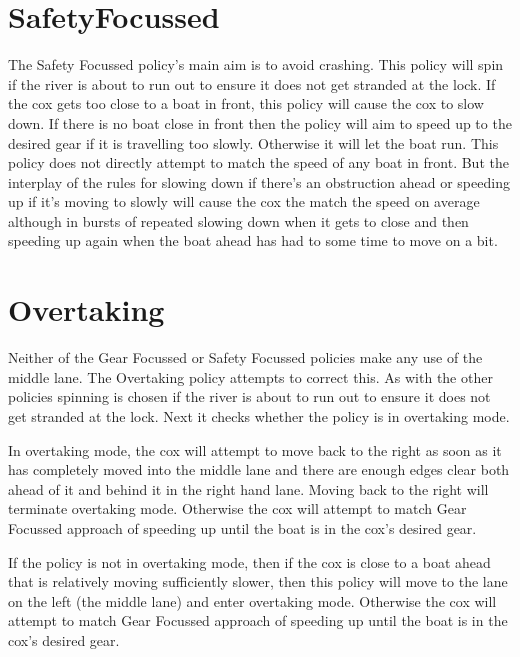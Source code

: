 \section{SafetyFocussed}

The Safety Focussed policy's main aim is to avoid crashing. This policy will spin if the river is about to run out to ensure it does not get stranded at the lock. If the cox gets too close to a boat in front, this policy will cause the cox to slow down. If there is no boat close in front then the policy will aim to speed up to the desired gear if it is travelling too slowly. Otherwise it will let the boat run. This policy does not directly attempt to match the speed of any boat in front. But the interplay of the rules for slowing down if there's an obstruction ahead or speeding up if it's moving to slowly will cause the cox the match the speed on average although in bursts of repeated slowing down when it gets to close and then speeding up again when the boat ahead has had to some time to move on a bit.

\section{Overtaking}

Neither of the Gear Focussed or Safety Focussed policies make any use of the middle lane. The Overtaking policy attempts to correct this. As with the other policies spinning is chosen if the river is about to run out to ensure it does not get stranded at the lock. Next it checks whether the policy is in overtaking mode.

In overtaking mode, the cox will attempt to move back to the right as soon as it has completely moved into the middle lane and there are enough edges clear both ahead of it and behind it in the right hand lane. Moving back to the right will terminate overtaking mode. Otherwise the cox will attempt to match Gear Focussed approach of speeding up until the boat is in the cox's desired gear.

If the policy is not in overtaking mode, then if the cox is close to a boat ahead that is relatively moving sufficiently slower, then this policy will move to the lane on the left (the middle lane) and enter overtaking mode. Otherwise the cox will attempt to match Gear Focussed approach of speeding up until the boat is in the cox's desired gear.